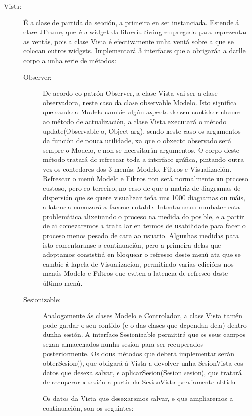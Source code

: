\begin{description}

\item[Vista:] \hfill
É a clase de partida da sección, a primeira en ser instanciada. Estende á clase JFrame, que é o widget da librería Swing empregado para representar as ventás, pois a clase Vista é efectivamente unha ventá sobre a que se colocan outros widgets. Implementará 3 interfaces que a obrigarán a darlle corpo a unha serie de métodos:
\begin{description}
\item[Observer:] \hfill
De acordo co patrón Observer, a clase Vista vai ser a clase observadora, neste caso da clase observable Modelo. Isto significa que cando o Modelo cambie algún aspecto do seu contido e chame ao método de actualización, a clase Vista executará o método update(Observable o, Object arg), sendo neste caso os argumentos da función de pouca utilidade, xa que o obxecto observado será sempre o Modelo, e non se necesitarán argumentos. O corpo deste método tratará de refrescar toda a interface gráfica, pintando outra vez os contedores dos 3 menús: Modelo, Filtros e Visualización.
Refrescar o menú Modelo e Filtros non será normalmente un proceso custoso, pero co terceiro, no caso de que a matriz de diagramas de dispersión que se quere visualizar teña uns 1000 diagramas ou máis, a latencia comezará a facerse notable. Intentaremos combater esta problemática alixeirando o proceso na medida do posible, e a partir de aí comezaremos a traballar en termos de usabilidade para facer o proceso menos pesado de cara ao usuario.
Algunhas medidas para isto comentaranse a continuación, pero a primeira delas que adoptamos consistirá en bloquear o refresco deste menú ata que se cambie á lapela de Visualización, permitindo varias edicións nos menús Modelo e Filtros que eviten a latencia de refresco deste último menú.
\item[Sesionizable:] \hfill
Analogamente ás clases Modelo e Controlador, a clase Vista tamén pode gardar o seu contido (e o das clases que dependan dela) dentro dunha sesión. A interface Sesionizable permitirá que os seus campos sexan almacenados nunha sesión para ser recuperados posteriormente. Os dous métodos que deberá implementar serán obterSesion(), que obligará á Vista a devolver unha SesionVista cos datos que desexa salvar, e aplicarSesion(Sesion sesion), que tratará de recuperar a sesión a partir da SesionVista previamente obtida.

Os datos da Vista que desexaremos salvar, e que ampliaremos a continuación, son os seguintes:


\end{description}
\end{description}
